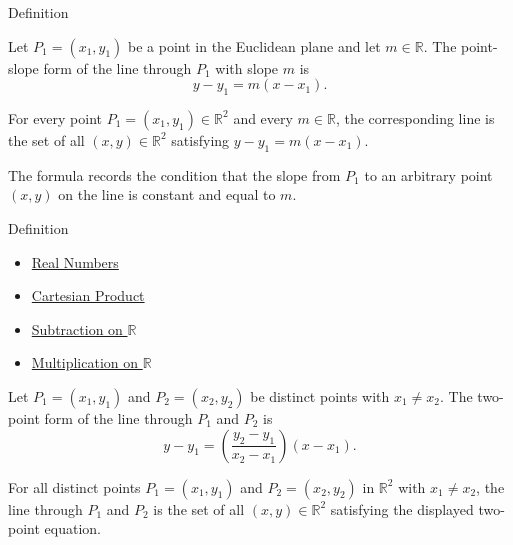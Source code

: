 \begin{definitionbox}{Definition}
\begin{definition}
\label{def:point-slope-form}
Let $P_1=(x_1,y_1)$ be a point in the Euclidean plane and let
$m\in\mathbb{R}$. The point-slope form of the line through $P_1$ with slope
$m$ is
\[
  y-y_1=m(x-x_1).
\]
\end{definition}
\end{definitionbox}\begin{remark*}
For every point $P_1=(x_1,y_1)\in\mathbb{R}^2$ and every
$m\in\mathbb{R}$, the corresponding line is the set of all
$(x,y)\in\mathbb{R}^2$ satisfying $y-y_1=m(x-x_1)$.
\end{remark*}

\begin{remark*}[Derivation]
The formula records the condition that the slope from $P_1$ to an arbitrary
point $(x,y)$ on the line is constant and equal to $m$.
\end{remark*}

\begin{definitionbox}{Definition}

\begin{dependencies}
\begin{itemize}
  \item \hyperref[def:reals]{Real Numbers}
  \item \hyperref[def:cartesian-product]{Cartesian Product}
  \item \hyperref[def:subtraction-on-r]{Subtraction on $\mathbb{R}$}
  \item \hyperref[def:multiplication-on-r]{Multiplication on $\mathbb{R}$}
\end{itemize}
\end{dependencies}
\begin{definition}
\label{def:two-point-form}
Let $P_1=(x_1,y_1)$ and $P_2=(x_2,y_2)$ be distinct points with
$x_1\neq x_2$. The two-point form of the line through $P_1$ and $P_2$ is
\[
  y-y_1=\left(\frac{y_2-y_1}{x_2-x_1}\right)(x-x_1).
\]
\end{definition}
\end{definitionbox}\begin{remark*}
For all distinct points $P_1=(x_1,y_1)$ and $P_2=(x_2,y_2)$ in
$\mathbb{R}^2$ with $x_1\neq x_2$, the line through $P_1$ and $P_2$ is the set
of all $(x,y)\in\mathbb{R}^2$ satisfying the displayed two-point equation.
\end{remark*}

